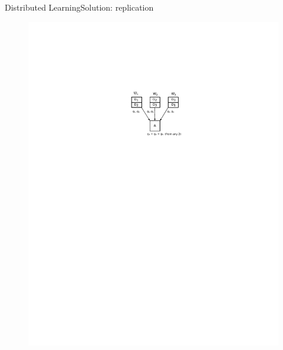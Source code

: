 \documentclass{beamer}
\begin{document}
\begin{frame}{Distributed Learning}{Solution: replication}

\begin{figure}
    \centering
    \includegraphics[height=.7\textheight]{res/replicate.pdf}
\end{figure}

\end{frame}
\end{document}
